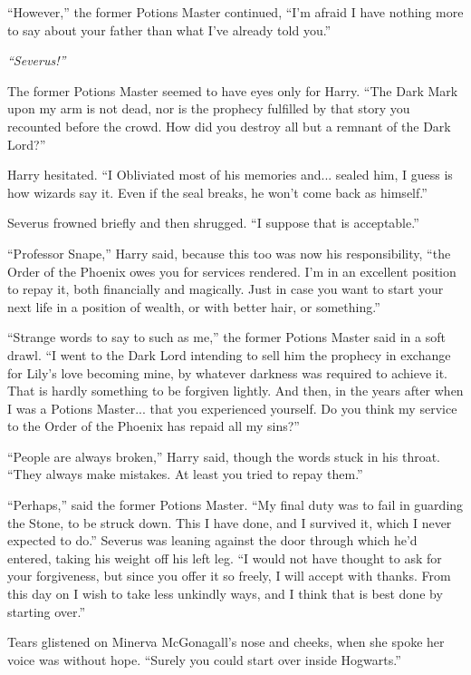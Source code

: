 ``However,'' the former Potions Master continued, ``I'm afraid I have nothing more to say about your father than what I've already told you.''

\emph{``Severus!''}

The former Potions Master seemed to have eyes only for Harry. ``The Dark Mark upon my arm is not dead, nor is the prophecy fulfilled by that story you recounted before the crowd. How did you destroy all but a remnant of the Dark Lord?''

Harry hesitated. ``I Obliviated most of his memories and... sealed him, I guess is how wizards say it. Even if the seal breaks, he won't come back as himself.''

Severus frowned briefly and then shrugged. ``I suppose that is acceptable.''

``Professor Snape,'' Harry said, because this too was now his responsibility, ``the Order of the Phoenix owes you for services rendered. I'm in an excellent position to repay it, both financially and magically. Just in case you want to start your next life in a position of wealth, or with better hair, or something.''

``Strange words to say to such as me,'' the former Potions Master said in a soft drawl. ``I went to the Dark Lord intending to sell him the prophecy in exchange for Lily's love becoming mine, by whatever darkness was required to achieve it. That is hardly something to be forgiven lightly. And then, in the years after when I was a Potions Master... that you experienced yourself. Do you think my service to the Order of the Phoenix has repaid all my sins?''

``People are always broken,'' Harry said, though the words stuck in his throat. ``They always make mistakes. At least you tried to repay them.''

``Perhaps,'' said the former Potions Master. ``My final duty was to fail in guarding the Stone, to be struck down. This I have done, and I survived it, which I never expected to do.'' Severus was leaning against the door through which he'd entered, taking his weight off his left leg. ``I would not have thought to ask for your forgiveness, but since you offer it so freely, I will accept with thanks. From this day on I wish to take less unkindly ways, and I think that is best done by starting over.''

Tears glistened on Minerva McGonagall's nose and cheeks, when she spoke her voice was without hope. ``Surely you could start over inside Hogwarts.''


